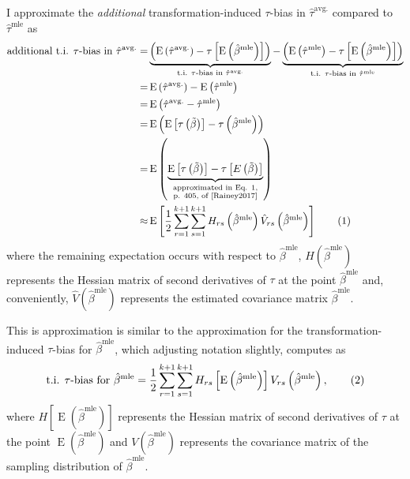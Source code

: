 \documentclass[10pt]{article}
\newcommand\numberthis{\addtocounter{equation}{1}\tag{\theequation}}
\DeclareMathOperator*{\E}{\text{E}}
\begin{document}
I approximate the \textit{additional} transformation-induced $\tau$-bias in $\hat{\tau}^\text{avg.}$ compared to $\hat{\tau}^\text{mle}$ as
\begin{align*}
\text{additional t.i. $\tau$-bias in } \hat{\tau}^\text{avg.} =& \underbrace{\left( \E \left( \hat{\tau}^\text{avg.}\right) - \tau \left[\E \left( \hat{\beta}^\text{mle} \right) \right] \right) }_{\text{t.i. } \tau\text{-bias in }\hat{\tau}^{\text{avg.}}} - \underbrace{ \left( \E \left( \hat{\tau}^\text{mle}\right) -  \tau \left[\E \left( \hat{\beta}^\text{mle} \right) \right] \right)}_{\text{t.i. } \tau\text{-bias in }\hat{\tau}^{\text{mle}}}\\
=& \E \left( \hat{\tau}^\text{avg.}\right) - \E \left( \hat{\tau}^\text{mle}\right)\\
=& \E \left( \hat{\tau}^\text{avg.} - \hat{\tau}^\text{mle} \right)\\
=& \E \left(     \E \left[ \tau\left( \tilde{\beta} \right) \right]      -      \tau \left( \hat{\beta}^\text{mle} \right)     \right)\\
=& \E \left(     \underbrace{\E \left[ \tau\left( \tilde{\beta} \right) \right]      -      \tau \left[ E\left(  \tilde{\beta} \right)\right]}_{\substack{\text{approximated in Eq. 1,} \\ \text{p. 405, of \cite{Rainey2017}}}}   \right)\\
\approx & \E \left[ \dfrac{1}{2} \displaystyle \sum_{r = 1}^{k+1} \sum_{s = 1}^{k+1} H_{rs}\left( \hat{\beta}^\text{mle} \right) \hat{V}_{rs} \left( \hat{\beta}^{\text{mle}} \right) \right] \numberthis \label{eqn:avg-approx}
\end{align*}
where the remaining expectation occurs with respect to $\hat{\beta}^\text{mle}$, $H\left( \hat{\beta}^\text{mle} \right)$ represents the Hessian matrix of second derivatives of $\tau$ at the point $\hat{\beta}^\text{mle}$ and, conveniently, $\hat{V} \left( \hat{\beta}^{\text{mle}} \right)$ represents the estimated covariance matrix $\hat{\beta}^\text{mle}$.  

This is approximation is similar to the approximation for the transformation-induced $\tau$-bias for $\hat{\beta}^\text{mle}$, which adjusting notation slightly, \citet[p. 405, Eq. 1]{Rainey2017} computes as 
\begin{align*}
\text{t.i. } \tau \text{-bias for } \hat{\beta}^\text{mle} = \dfrac{1}{2} \displaystyle \sum_{r = 1}^{k+1} \sum_{s = 1}^{k+1} H_{rs}\left[ \E \left( \hat{\beta}^\text{mle} \right) \right] V_{rs} \left( \hat{\beta}^{\text{mle}} \right), \numberthis \label{eqn:mle-approx}
\end{align*} 
where $H\left[ \E \left( \hat{\beta}^\text{mle} \right) \right]$ represents the Hessian matrix of second derivatives of $\tau$ at the point $\E \left( \hat{\beta}^\text{mle} \right)$ and $V \left( \hat{\beta}^{\text{mle}} \right)$ represents the covariance matrix of the sampling distribution of $\hat{\beta}^\text{mle}$.
\end{document}
